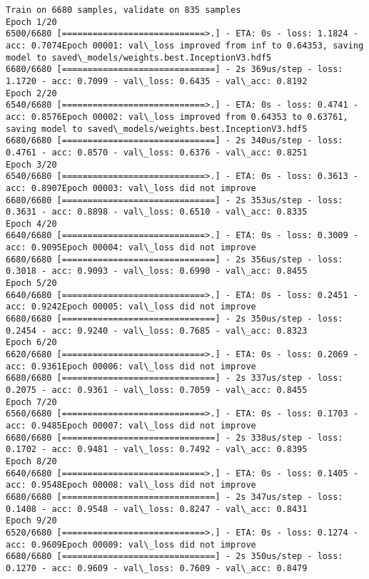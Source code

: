 \documentclass[11pt]{article}
\begin{document}
    \begin{Verbatim}[commandchars=\\\{\}]
Train on 6680 samples, validate on 835 samples
Epoch 1/20
6500/6680 [============================>.] - ETA: 0s - loss: 1.1824 - acc: 0.7074Epoch 00001: val\_loss improved from inf to 0.64353, saving model to saved\_models/weights.best.InceptionV3.hdf5
6680/6680 [==============================] - 2s 369us/step - loss: 1.1720 - acc: 0.7099 - val\_loss: 0.6435 - val\_acc: 0.8192
Epoch 2/20
6540/6680 [============================>.] - ETA: 0s - loss: 0.4741 - acc: 0.8576Epoch 00002: val\_loss improved from 0.64353 to 0.63761, saving model to saved\_models/weights.best.InceptionV3.hdf5
6680/6680 [==============================] - 2s 340us/step - loss: 0.4761 - acc: 0.8570 - val\_loss: 0.6376 - val\_acc: 0.8251
Epoch 3/20
6540/6680 [============================>.] - ETA: 0s - loss: 0.3613 - acc: 0.8907Epoch 00003: val\_loss did not improve
6680/6680 [==============================] - 2s 353us/step - loss: 0.3631 - acc: 0.8898 - val\_loss: 0.6510 - val\_acc: 0.8335
Epoch 4/20
6640/6680 [============================>.] - ETA: 0s - loss: 0.3009 - acc: 0.9095Epoch 00004: val\_loss did not improve
6680/6680 [==============================] - 2s 356us/step - loss: 0.3018 - acc: 0.9093 - val\_loss: 0.6990 - val\_acc: 0.8455
Epoch 5/20
6640/6680 [============================>.] - ETA: 0s - loss: 0.2451 - acc: 0.9242Epoch 00005: val\_loss did not improve
6680/6680 [==============================] - 2s 350us/step - loss: 0.2454 - acc: 0.9240 - val\_loss: 0.7685 - val\_acc: 0.8323
Epoch 6/20
6620/6680 [============================>.] - ETA: 0s - loss: 0.2069 - acc: 0.9361Epoch 00006: val\_loss did not improve
6680/6680 [==============================] - 2s 337us/step - loss: 0.2075 - acc: 0.9361 - val\_loss: 0.7059 - val\_acc: 0.8455
Epoch 7/20
6560/6680 [============================>.] - ETA: 0s - loss: 0.1703 - acc: 0.9485Epoch 00007: val\_loss did not improve
6680/6680 [==============================] - 2s 338us/step - loss: 0.1702 - acc: 0.9481 - val\_loss: 0.7492 - val\_acc: 0.8395
Epoch 8/20
6640/6680 [============================>.] - ETA: 0s - loss: 0.1405 - acc: 0.9548Epoch 00008: val\_loss did not improve
6680/6680 [==============================] - 2s 347us/step - loss: 0.1408 - acc: 0.9548 - val\_loss: 0.8247 - val\_acc: 0.8431
Epoch 9/20
6520/6680 [============================>.] - ETA: 0s - loss: 0.1274 - acc: 0.9609Epoch 00009: val\_loss did not improve
6680/6680 [==============================] - 2s 350us/step - loss: 0.1270 - acc: 0.9609 - val\_loss: 0.7609 - val\_acc: 0.8479

\end{Verbatim}
\end{document}
